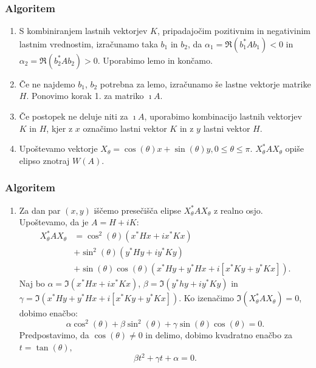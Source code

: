 \documentclass{beamer}
\newcounter{saveenumi}
\newcommand{\seti}{\setcounter{saveenumi}{\value{enumi}}}
\newcommand{\conti}{\setcounter{enumi}{\value{saveenumi}}}
\begin{document}
\begin{frame}
\frametitle{Algoritem}
\begin{enumerate}[1.]
\item S kombiniranjem lastnih vektorjev $K$, pripadajočim pozitivnim in negativinim lastnim vrednostim, izračunamo taka $b_1$ in $b_2$, da  $\alpha_1=\Re(b_1^\ast Ab_1)<0$ in $\alpha_2=\Re(b_2^\ast Ab_2)>0$. Uporabimo lemo in končamo.\medskip
\item Če ne najdemo $b_1$, $b_2$ potrebna za lemo, izračunamo še lastne vektorje matrike $H$.  Ponovimo korak 1. za matriko $\imath A$.\medskip
\item Če postopek ne deluje niti za $\imath A$, uporabimo kombinacijo lastnih vektorjev $K$ in $H$, kjer z $x$ označimo lastni vektor $K$ in z $y$ lastni vektor $H$.\medskip
\item Upoštevamo vektorje $X_\theta =\cos(\theta)x+\sin(\theta)y$$, 0\le\theta\le\pi$. $X_\theta ^\ast AX_\theta$ opiše elipso znotraj $W(A)$.
\seti
\end{enumerate}
\end{frame}
\begin{frame}
\frametitle{Algoritem}
\begin{enumerate}[1.]
\conti
\item Za dan par $(x,y)$ iščemo presečišča elipse $X_\theta ^\ast AX_\theta$ z realno osjo. U\-po\-šte\-va\-mo, da je $A=H+iK$: 
\begin{align*}
X_\theta^\ast AX_\theta &= \cos^2(\theta)(x^\ast Hx + ix^\ast Kx)\\ 
&+ \sin^2(\theta)(y^\ast Hy + iy^\ast Ky)\\ 
&+\sin(\theta)\cos(\theta)(x^\ast Hy +y^\ast Hx +i[x^\ast Ky +y^\ast Kx]).
\end{align*}
Naj bo $\alpha=\Im(x^\ast Hx + ix^\ast Kx)$, $\beta=\Im(y^\ast hy +iy^\ast Ky)$ in\medskip $\gamma=\Im(x^\ast Hy +y^\ast Hx +i[x^\ast Ky +y^\ast Kx]).$ Ko izenačimo $\Im(X_\theta ^\ast AX_\theta)=0$, dobimo enačbo:
$$\alpha \cos^2(\theta) +\beta \sin^2(\theta) +\gamma \sin(\theta)\cos(\theta)=0.$$
Predpostavimo, da $\cos(\theta) \not =0$ in delimo, dobimo kvadratno enačbo za $t=\tan(\theta),$
$$\beta t^2 +\gamma t +\alpha =0.$$
\seti
\end{enumerate}
\end{frame}
\end{document}
